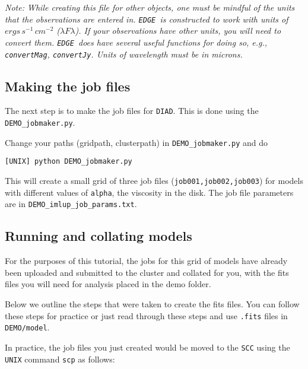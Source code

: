 \documentclass{article}
\newcommand{\edge}{\texttt{EDGE }}
\begin{document}
\vspace{2mm}

\noindent \textit{Note: While creating this file for other objects, one must be mindful of the units that the observations are entered in. \edge is constructed to work with units of $ergs\,s^{-1}\,cm^{-2}$ ($\lambda F \lambda$). If your observations have other units, you will need to convert them. \edge does have several useful functions for doing so, e.g., \texttt{convertMag}, \texttt{convertJy}. Units of wavelength must be in microns.}

\subsection{Making the job files}

The next step is to make the job files for \texttt{DIAD}. This is done using the \texttt{DEMO\_jobmaker.py}. 

Change your paths (gridpath, clusterpath) in \texttt{DEMO\_jobmaker.py} and do

\vspace{2mm}
\texttt{[UNIX] python DEMO\_jobmaker.py}
\vspace{2mm}

\noindent This will create a small grid of three job files (\texttt{job001,job002,job003}) for models with different values of \texttt{alpha}, the viscosity in the disk.  The job file parameters are in \texttt{DEMO\_imlup\_job\_params.txt}.

\subsection{Running and collating models} \label{running}

\noindent For the purposes of this tutorial, the jobs for this grid of models have already been uploaded and submitted to the cluster and collated for you, with the fits files you will need for analysis placed in the demo folder. 
\vspace{2mm}

\noindent Below we outline the steps that were taken to create the fits files.  You can follow these steps for practice or just read through these steps and use \texttt{.fits} files in \texttt{DEMO/model}.
\vspace{2mm}

\noindent In practice, the job files you just created would be moved to the \texttt{SCC} using the \texttt{UNIX} command \texttt{scp} as follows: 
\end{document}
